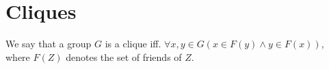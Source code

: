 %
%

\section{Cliques}
We say that a group $G$ is a clique iff. $\forall x,y \in G ( x \in F(y) \land
y \in F(x) )$, where $F(Z)$ denotes the set of friends of $Z$.

